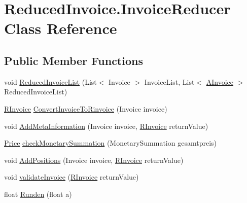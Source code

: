 \hypertarget{class_reduced_invoice_1_1_invoice_reducer}{}\section{Reduced\+Invoice.\+Invoice\+Reducer Class Reference}
\label{class_reduced_invoice_1_1_invoice_reducer}
\subsection*{Public Member Functions}
\begin{DoxyCompactItemize}
\item 
void \hyperlink{class_reduced_invoice_1_1_invoice_reducer_af064188d62db15e810468e4811af6cc5}{Reduced\+Invoice\+List} (List$<$ Invoice $>$ Invoice\+List, List$<$ \hyperlink{class_reduced_invoice_1_1_a_invoice}{A\+Invoice} $>$ Reduced\+Invoice\+List)
\item 
\hyperlink{class_reduced_invoice_1_1_r_invoice}{R\+Invoice} \hyperlink{class_reduced_invoice_1_1_invoice_reducer_a424cf7731d065d541c0a1bc613f5834a}{Convert\+Invoice\+To\+Rinvoice} (Invoice invoice)
\item 
void \hyperlink{class_reduced_invoice_1_1_invoice_reducer_aefec8c846739b1fe168b3c8828f25f4c}{Add\+Meta\+Information} (Invoice invoice, \hyperlink{class_reduced_invoice_1_1_r_invoice}{R\+Invoice} return\+Value)
\item 
\hyperlink{class_reduced_invoice_1_1_price}{Price} \hyperlink{class_reduced_invoice_1_1_invoice_reducer_a6caff41f142502c44cbeefc7b1e44c9d}{check\+Monetary\+Summation} (Monetary\+Summation gesamtpreis)
\item 
void \hyperlink{class_reduced_invoice_1_1_invoice_reducer_a599dbd87601635791534a8624cb8f953}{Add\+Positions} (Invoice invoice, \hyperlink{class_reduced_invoice_1_1_r_invoice}{R\+Invoice} return\+Value)
\item 
void \hyperlink{class_reduced_invoice_1_1_invoice_reducer_a47e121912714be2caea8d2619c10a2f0}{validate\+Invoice} (\hyperlink{class_reduced_invoice_1_1_r_invoice}{R\+Invoice} return\+Value)
\item 
float \hyperlink{class_reduced_invoice_1_1_invoice_reducer_a4d9155f5cc7223ed2659a8567f9ba1ec}{Runden} (float a)
\end{DoxyCompactItemize}
